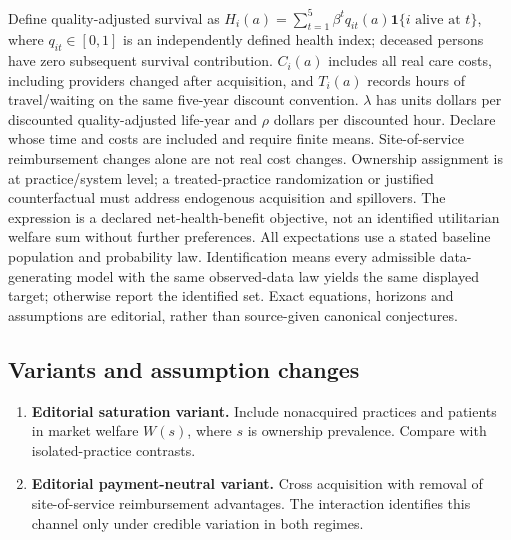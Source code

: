 \documentclass[11pt,a4paper]{article}
\begin{document}
Define quality-adjusted survival as \(H_i(a)=\sum_{t=1}^{5}\beta^t q_{it}(a)\mathbf1\{i\text{ alive at }t\}\), where \(q_{it}\in[0,1]\) is an independently defined health index; deceased persons have zero subsequent survival contribution. \(C_i(a)\) includes all real care costs, including providers changed after acquisition, and \(T_i(a)\) records hours of travel/waiting on the same five-year discount convention. \(\lambda\) has units dollars per discounted quality-adjusted life-year and \(\rho\) dollars per discounted hour. Declare whose time and costs are included and require finite means. Site-of-service reimbursement changes alone are not real cost changes. Ownership assignment is at practice/system level; a treated-practice randomization or justified counterfactual must address endogenous acquisition and spillovers. The expression is a declared net-health-benefit objective, not an identified utilitarian welfare sum without further preferences. All expectations use a stated baseline population and probability law. Identification means every admissible data-generating model with the same observed-data law yields the same displayed target; otherwise report the identified set. Exact equations, horizons and assumptions are editorial, rather than source-given canonical conjectures.
\subsection*{Variants and assumption changes}
\begin{enumerate}
\item \textbf{Editorial saturation variant.} Include nonacquired practices and patients in market welfare \(W(s)\), where \(s\) is ownership prevalence. Compare with isolated-practice contrasts.
\item \textbf{Editorial payment-neutral variant.} Cross acquisition with removal of site-of-service reimbursement advantages. The interaction identifies this channel only under credible variation in both regimes.
\end{enumerate}
\end{document}

